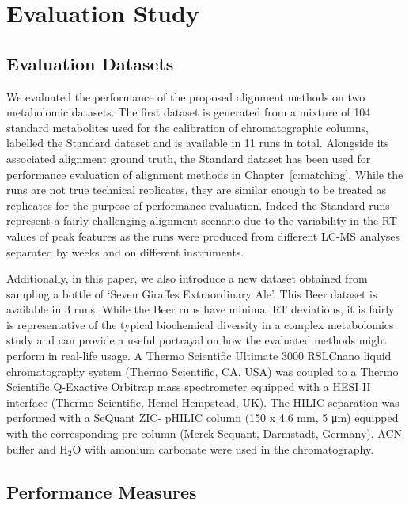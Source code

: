 
\section{Evaluation Study}

\subsection{Evaluation Datasets}

We evaluated the performance of the proposed alignment methods on two metabolomic datasets. The first dataset is generated from a mixture of 104 standard metabolites used for the calibration of chromatographic columns, labelled the Standard dataset and is available in 11 runs in total. Alongside its associated alignment ground truth, the Standard dataset has been used for performance evaluation of alignment methods in Chapter~\ref{c:matching}. While the runs are not true technical replicates, they are similar enough to be treated as replicates for the purpose of performance evaluation. Indeed the Standard runs represent a fairly challenging alignment scenario due to the variability in the RT values of peak features as the runs were produced from different LC-MS analyses separated by weeks and on different instruments.

Additionally, in this paper, we also introduce a new dataset obtained from sampling a bottle of `Seven Giraffes Extraordinary Ale'. This Beer dataset is available in 3 runs. While the Beer runs have minimal RT deviations, it is fairly is representative of the typical biochemical diversity in a complex metabolomics study and can provide a useful portrayal on how the evaluated methods might perform in real-life usage. A Thermo Scientific Ultimate 3000 RSLCnano liquid chromatography system (Thermo Scientific, CA, USA) was coupled to a Thermo Scientific Q-Exactive Orbitrap mass spectrometer equipped with a HESI II interface (Thermo Scientific, Hemel Hempstead, UK). The HILIC separation was performed with a SeQuant ZIC- pHILIC column (150 x 4.6 mm, 5 μm) equipped with the corresponding pre-column (Merck Sequant, Darmstadt, Germany). ACN buffer and H$_2$O with amonium carbonate were used in the chromatography.

\subsection{Performance Measures}

